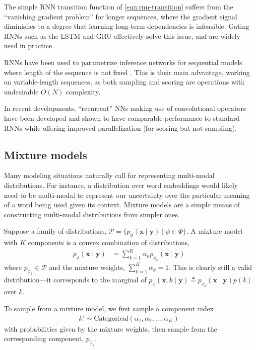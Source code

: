The simple RNN transition function of \eqref{eqn:rnn-transition} suffers from the ``vanishing gradient problem'' \citep{PascanuEtAl2013} for longer sequences, where the gradient signal diminishes to a degree that learning long-term dependencies is infeasible. Gating RNNs such as the LSTM \citep{HochreiterSchmidhuber1997, GersEtAl2000, GersSchmidhuber2000, GravesSchmidhuber2005} and GRU \citep{ChoEtAl2014, ChungEtAl2014, ChungEtAl2015} effectively solve this issue, and are widely used in practice.

RNNs have been used to parametrize inference networks for sequential models where length of the sequence is not fixed \citep{eslami2016attend, KrishnanEtAl2017}. This is their main advantage, working on variable-length sequences, as both sampling and scoring are operations with undesirable $O(N)$ complexity.

In recent developments, ``recurrent'' NNs making use of convolutional operators have been developed \citep{bradbury2016quasi, VanDenOordEtAl2016c, Kalchbrenner2016c, VanDenOordEtAl2016b} and shown to have comparable performance to standard RNNs while offering improved parallelization (for scoring but not sampling).

\subsection{Mixture models}
Many modeling situations naturally call for representing multi-modal distributions. For instance, a distribution over word embeddings would likely need to be multi-modal to represent our uncertainty over the particular meaning of a word being used given its context. Mixture models \citep{Bishop1994} are a simple means of constructing multi-modal distributions from simpler ones.

Suppose a family of distributions, $\mathcal{P}=\{p_\phi(\mathbf{x}\mid\mathbf{y})\mid\phi\in\Phi\}$. A mixture model with $K$ components is a convex combination of distributions,
\begin{align*}
	p_\phi(\mathbf{x}\mid\mathbf{y}) &= \sum^K_{k=1}\alpha_k p_{\phi_k}(\mathbf{x}\mid\mathbf{y})
\end{align*}
where $p_{\phi_k}\in\mathcal{P}$ and the mixture weights, $\sum^K_{k=1}\alpha_k=1$. This is clearly still a valid distribution---it corresponds to the marginal of $p_\phi(\mathbf{x},k\mid\mathbf{y})\triangleq p_{\phi_k}(\mathbf{x}\mid\mathbf{y})p(k)$ over $k$.

To sample from a mixture model, we first sample a component index
\begin{align*}
k'\sim\text{Categorical}(\alpha_1,\alpha_2,\ldots,\alpha_K)
\end{align*}
with probabilities given by the mixture weights, then sample from the corresponding component, $p_{\phi_k}$.

